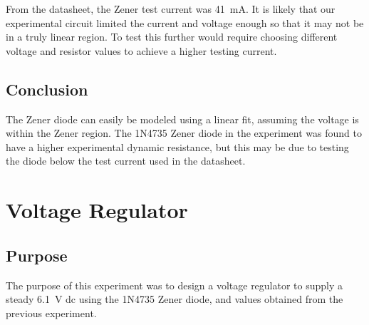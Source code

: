 \documentclass{report}
\begin{document}
From the datasheet, the Zener test current was \SI{41}{\mA}. It is likely that our experimental circuit limited the current and voltage enough so that it may not be in a truly linear region. To test this further would require choosing different voltage and resistor values to achieve a higher testing current.

\subsection{Conclusion}
The Zener diode can easily be modeled using a linear fit, assuming the voltage is within the Zener region. The 1N4735 Zener diode in the experiment was found to have a higher experimental dynamic resistance, but this may be due to testing the diode below the test current used in the datasheet.
\section{Voltage Regulator}

\subsection{Purpose}
The purpose of this experiment was to design a voltage regulator to supply a steady \SI{6.1}{\V} dc using the 1N4735 Zener diode, and values obtained from the previous experiment.
\end{document}
